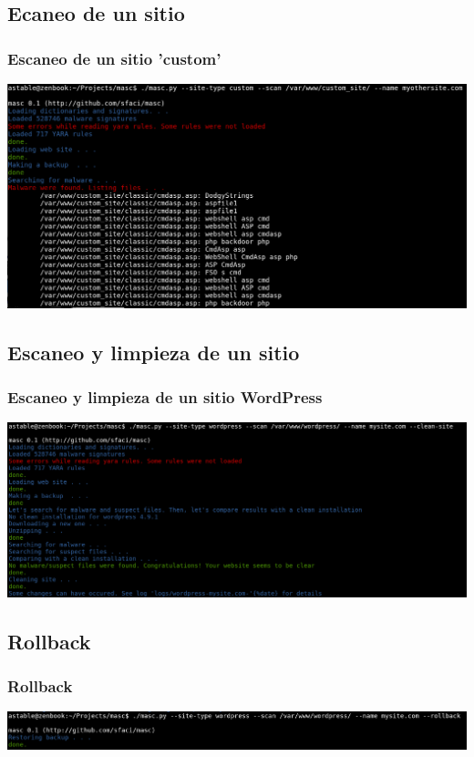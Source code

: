 \documentclass[xcolor={dvipsnames}]{beamer}
\begin{document}
\subsection{Ecaneo de un sitio}
\begin{frame}\frametitle{Escaneo de un sitio 'custom'}
    \includegraphics[scale=0.25]{custom_scan} 
\end{frame}

\subsection{Escaneo y limpieza de un sitio}
\begin{frame}\frametitle{Escaneo y limpieza de un sitio WordPress}
    \includegraphics[scale=0.21]{complete} 
\end{frame}

\subsection{Rollback}
\begin{frame}\frametitle{Rollback}
    \includegraphics[scale=0.23]{rollback} 
\end{frame}
\end{document}
